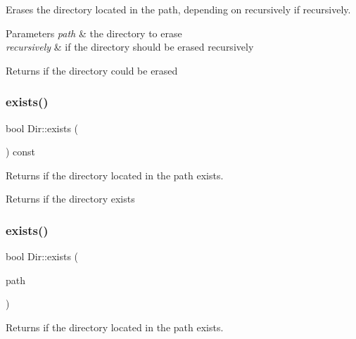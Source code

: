 Erases the directory located in the path, depending on recursively if recursively. 


\begin{DoxyParams}{Parameters}
{\em path} & the directory to erase \\
\hline
{\em recursively} & if the directory should be erased recursively \\
\hline
\end{DoxyParams}
\begin{DoxyReturn}{Returns}
if the directory could be erased 
\end{DoxyReturn}
\mbox{\label{class_dir_ac6bf80b5b3a034e8c144c86ef48ae309}} 
\subsubsection{\texorpdfstring{exists()}{exists()}\hspace{0.1cm}{\footnotesize\ttfamily [1/2]}}
{\footnotesize\ttfamily bool Dir\+::exists (\begin{DoxyParamCaption}{ }\end{DoxyParamCaption}) const}



Returns if the directory located in the path exists. 

\begin{DoxyReturn}{Returns}
if the directory exists 
\end{DoxyReturn}
\mbox{\label{class_dir_a27343faa005694b64f6c320f992d5937}} 
\subsubsection{\texorpdfstring{exists()}{exists()}\hspace{0.1cm}{\footnotesize\ttfamily [2/2]}}
{\footnotesize\ttfamily bool Dir\+::exists (\begin{DoxyParamCaption}\item[{const \mbox{\hyperlink{class_a_string}{A\+String}} \&}]{path }\end{DoxyParamCaption})\hspace{0.3cm}{\ttfamily [static]}}



Returns if the directory located in the path exists. 


